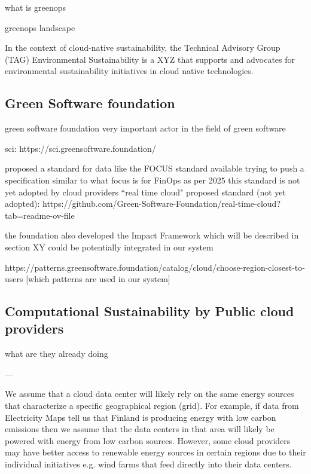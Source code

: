 what is greenops

greenops landscape 

In the context of cloud-native sustainability,
the Technical Advisory Group (TAG) Environmental Sustainability is a XYZ that supports and advocates for environmental sustainability initiatives in cloud native technologies.



\subsection{Green Software foundation}

green software foundation
very important actor in the field of green software

sci: https://sci.greensoftware.foundation/

proposed a standard for data like the FOCUS standard available 
trying to push a specification similar to what focus is for FinOps
as per 2025 this standard is not yet adopted by cloud providers
``real time cloud" proposed standard (not yet adopted): https://github.com/Green-Software-Foundation/real-time-cloud?tab=readme-ov-file

the foundation also developed the Impact Framework which will be described in section XY
could be potentially integrated in our system

https://patterns.greensoftware.foundation/catalog/cloud/choose-region-closest-to-users
[which patterns are used in our system]

\subsection{Computational Sustainability by Public cloud providers}

what are they already doing

---

We assume that a cloud data center will likely rely on the same energy sources that characterize a specific geographical region (grid).
For example, if data from Electricity Maps tell us that Finland is producing energy with low carbon emissions then we assume that the data centers in that area will likely be powered with energy from low carbon sources.
However, some cloud providers may have better access to renewable energy sources in certain regions due to their individual initiatives e.g. wind farms that feed directly into their data centers.


